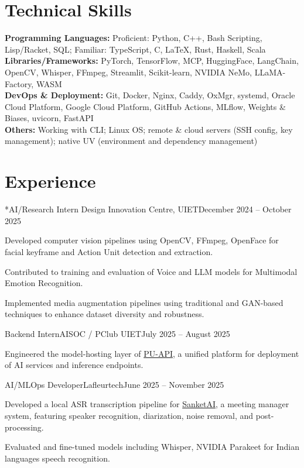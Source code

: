 \documentclass[10pt, letterpaper]{article}
\newcommand{\skillsentry}[2]{\textbf{#1:} {\RaggedRight #2}}
\newenvironment{compactskills}{%
    \begingroup\small\RaggedRight\setlength{\parskip}{2pt}\setlength{\parindent}{0pt}%
    \hyphenpenalty=500 \exhyphenpenalty=500 \sloppy%
}{\par\endgroup}
\begin{document}
\section{Technical Skills}
\begin{compactskills}
\skillsentry{Programming Languages}{Proficient: Python, C++, Bash Scripting, Lisp/Racket, SQL; Familiar: TypeScript, C, LaTeX, Rust, Haskell, Scala}\\
\skillsentry{Libraries/Frameworks}{PyTorch, TensorFlow, MCP, HuggingFace, LangChain, OpenCV, Whisper, FFmpeg, Streamlit, Scikit-learn, NVIDIA NeMo, LLaMA-Factory, WASM}\\
\skillsentry{DevOps \& Deployment}{Git, Docker, Nginx, Caddy, OxMgr, systemd, Oracle Cloud Platform, Google Cloud Platform, GitHub Actions, MLflow, Weights \& Biases, uvicorn, FastAPI}\\
\skillsentry{Others}{Working with CLI; Linux OS; remote \& cloud servers (SSH config, key management); native UV (environment and dependency management)}\\
\end{compactskills}


\section{Experience}

\begin{experienceentry}*{AI/Research Intern }{Design Innovation Centre, UIET}{December 2024 -- October 2025}
    \item Developed computer vision pipelines using OpenCV, FFmpeg, OpenFace for facial keyframe and Action Unit detection and extraction.
    \item Contributed to training and evaluation of Voice and LLM models for Multimodal Emotion Recognition.
    \item Implemented media augmentation pipelines using traditional and GAN-based techniques to enhance dataset diversity and robustness.
    \begin{subexperienceentry}{Backend Intern}{AISOC / PClub UIET}{July 2025 -- August 2025}
        \item Engineered the model-hosting layer of \href{https://puapi.vercel.app/}{PU-API}, a unified platform for deployment of AI services and inference endpoints.
    \end{subexperienceentry}
\end{experienceentry}

\begin{experienceentry}{AI/MLOps Developer}{Lafleurtech}{June 2025 -- November 2025}
    \item Developed a local ASR transcription pipeline for \href{https://sanketai.co.in/}{SanketAI}, a meeting manager system, featuring speaker recognition, diarization, noise removal, and post-processing.
    \item Evaluated and fine-tuned models including Whisper, NVIDIA Parakeet for Indian languages speech recognition.
\end{experienceentry}
\end{document}
